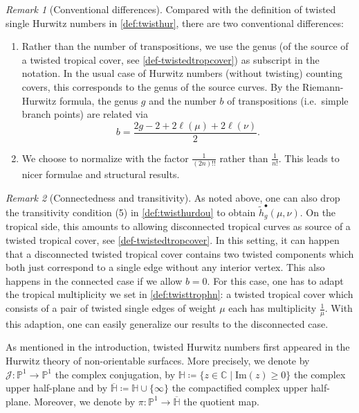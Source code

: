 \documentclass[10pt]{amsart}
\theoremstyle{plain}
\theoremstyle{definition}
\theoremstyle{definition}
\theoremstyle{plain}
\theoremstyle{plain}
\theoremstyle{remark}
\newtheorem{rema}[rema]{Remark}
\theoremstyle{plain}
\theoremstyle{plain}
\begin{document}
\begin{rema}[Conventional differences]
Compared with the definition of twisted single Hurwitz numbers in \cref{def:twisthur}, there are two conventional differences:
\begin{enumerate}
    \item Rather than the number of transpositions, we use the genus (of the source of a twisted tropical cover, see \cref{def-twistedtropcover}) as subscript in the notation. In the usual case of Hurwitz numbers (without twisting) counting covers, this corresponds to the genus of the source curves. By the Riemann-Hurwitz formula, the genus $g$ and the number $b$ of transpositions (i.e.\ simple branch points) are related via
    $$b=\frac{2g-2+2\ell(\mu)+2\ell(\nu)}{2}.$$

    \item We choose to normalize with the factor $\frac{1}{(2n)!!}$ rather than $\frac{1}{n!}$. This leads to nicer formulae and structural results.
\end{enumerate}

\end{rema}
\begin{rema}[Connectedness and transitivity]
    As noted above, one can also drop the transitivity condition (5) in \cref{def:twisthurdou} to obtain $\tilde{h}_g^\bullet(\mu,\nu)$. On the tropical side, this amounts to allowing disconnected tropical curves as source of a twisted tropical cover, see \cref{def-twistedtropcover}. In this setting, it can happen that a disconnected twisted tropical cover contains two twisted components which both just correspond to a single edge without any interior vertex. This also happens in the connected case if we allow $b=0$. For this case, one has to adapt the tropical multiplicity we set in \cref{def:twisttrophn}: a twisted tropical cover which consists of a pair of twisted single edges of weight $\mu$ each has multiplicity $\frac{1}{\mu}$. With this adaption, one can easily generalize our results to the disconnected case.
\end{rema}

As mentioned in the introduction, twisted Hurwitz numbers first appeared in the Hurwitz theory of non-orientable surfaces. More precisely, we denote by $\mathcal{J}\colon\mathbb{P}^1\to\mathbb{P}^1$ the complex conjugation, by $\mathbb{H}\coloneqq\{z\in\mathbb{C}\mid\mathrm{Im}(z)\ge0\}$ the complex upper half-plane and by $\overline{\mathbb{H}}\coloneqq\mathbb{H}\cup\{\infty\}$ the compactified complex upper half-plane. Moreover, we denote by $\pi\colon\mathbb{P}^1\to\overline{\mathbb{H}}$ the quotient map.
\end{document}
